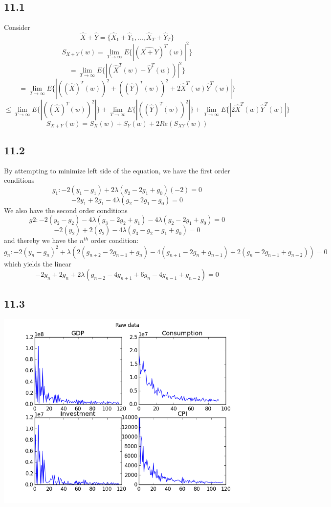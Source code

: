 \documentclass[letterpaper,12pt]{article}
\theoremstyle{definition}
\begin{document}
\subsection*{11.1}



Consider
 \[\hat{X}+\hat{Y}=\{\hat{X}_1+\hat{Y}_1,...,\hat{X}_T+\hat{Y}_T\}\]
\[S_{X+Y}(w)=\lim_{T \rightarrow \infty}E\{|(\hat{X+Y})^T(w)|^2\}\]
\[=\lim_{T \rightarrow \infty}E\{|(\hat{X}^T(w)+\hat{Y}^T(w))|^2\}\]
\[=\lim_{T \rightarrow \infty}E\{|((\hat{X})^T(w))^2+((\hat{Y})^T(w))^2+2\hat{X}^T(w)\hat{Y}^T(w)|\}\]
\[\le \lim_{T \rightarrow \infty}E\{|((\hat{X})^T(w))^2|\}+\lim_{T \rightarrow \infty}E\{|((\hat{Y})^T(w))^2|\}+\lim_{T \rightarrow \infty}E\{|2\hat{X}^T(w)\hat{Y}^T(w)|\}\]
\[S_{X+Y}(w)=S_X(w)+S_Y(w)+2Re(S_{XY}(w))\]

\subsection*{11.2}

By attempting to minimize left side of the equation, we have the first order conditions
\[g_1:-2(y_1-g_1)+2\lambda(g_2-2g_1+g_0)(-2)=0\]
\[-2y_1+2g_1-4\lambda(g_2-2g_1-g_0)=0\]
We also have the second order conditions
\[g2: -2(y_2-g_2)-4\lambda(g_3-2g_2+g_1)-4\lambda(g_2-2g_1+g_0)=0\]
\[-2(y_2)+2(g_2)-4 \lambda (g_3-g_2-g_1+g_0)=0\]
and thereby we have the $n^{th}$ order condition:
\[g_n:-2(y_n-g_n)^2+\lambda(2(g_{n+2}-2g_{n+1}+g_n)-4(g_{n+1}-2g_n+g_{n-1})+2(g_n-2g_{n-1}+g_{n-2}))=0\]
which yields the linear
\[-2y_n+2g_n+2\lambda(g_{n+2}-4g_{n+1}+6g_n-4g_{n-1}+g_{n-2})=0\]
\subsection*{11.3}


\includegraphics[scale = .75]{eleventhree}
\end{document}
